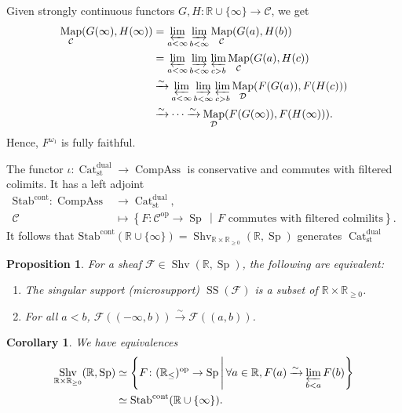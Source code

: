 \documentclass[draft]{amsart}
\newcommand{\RR}{\mathbb{R}}
\newcommand{\set}[2]{\left\{#1\,\middle|\,#2\right\}}
\newcommand{\cat}[1]{\mathcal{#1}}
\newcommand{\sheaf}[1]{\mathcal{#1}}
\newcommand{\op}{\mathrm{op}}
\newcommand{\isoto}{\mathbin{\xrightarrow{\sim}}}
\newcommand{\Stab}{\mathrm{Stab}}
\DeclareMathOperator{\SingularSupport}{SS}
\DeclareMathOperator{\Map}{Map}
\DeclareMathOperator{\Shv}{Shv}
\DeclareMathOperator{\Cat}{Cat}
\DeclareMathOperator{\CompAss}{CompAss}
\DeclareMathOperator{\Sp}{Sp}
\newtheorem{prop}[thm]{Proposition}
\newtheorem{cor}[thm]{Corollary}
\theoremstyle{definition}
\begin{document}
Given strongly continuous functors $G, H\colon \RR\cup \{\infty\} \to \cat C$, we get
\begin{align*}
\Map_{\cat C}(G(\infty), H(\infty)) &= \varprojlim\limits_{a<\infty} \varinjlim\limits_{b<\infty} \Map_{\cat C}(G(a), H(b)) \\
&= \varprojlim\limits_{a<\infty} \varinjlim\limits_{b<\infty} \varprojlim\limits_{c>b} \Map_{\cat C}(G(a), H(c)) \\
&\isoto \varprojlim\limits_{a<\infty} \varinjlim\limits_{b<\infty} \varprojlim\limits_{c>b} \Map_{\cat D}(F(G(a)), F(H(c))) \\
&\isoto \dotsb \isoto \Map_{\cat D}(F(G(\infty)), F(H(\infty))).
\end{align*}
Hence, $F^{\omega_1}$ is fully faithful.
\bigskip

The functor $\iota\colon \Cat^{\mathrm{dual}}_{\mathrm{st}} \to \CompAss$ is conservative and commutes with filtered colimits. It has a left adjoint 
\begin{align*}
\Stab^{\mathrm{cont}} \colon \CompAss &\to \Cat^{\mathrm{dual}}_{\mathrm{st}}, \\
\cat C &\mapsto \set{F\colon \cat C^\op\to \Sp}{\text{$F$ commutes with filtered colmilits}}.
\end{align*}
It follows that $\Stab^{\mathrm{cont}}(\RR\cup\{\infty\}) = \Shv_{\RR\times \RR_{\ge0}}(\RR, \Sp)$ generates $\Cat^{\mathrm{dual}}_{\mathrm{st}}$

\begin{prop}
For a sheaf $\sheaf F \in \Shv(\RR, \Sp)$, the following are equivalent:
\begin{enumerate}[(1)]
\item The singular support (microsupport) $\SingularSupport(\sheaf F)$ is a subset of $\RR\times \RR_{\ge0}$.
\item For all $a<b$, $\sheaf F((-\infty,b)) \isoto \sheaf F((a,b))$.
\end{enumerate}
\end{prop}

\begin{cor}
We have equivalences
\begin{align*}
\Shv_{\RR\times \RR_{\ge0}}(\RR, \Sp) &\simeq \set{F\colon (\RR_{\le})^\op \to \Sp}{\forall a\in \RR, F(a) \isoto \varprojlim\limits_{b<a} F(b)} \\
&\simeq \Stab^{\mathrm{cont}}(\RR\cup\{\infty\}).
\end{align*}
\end{cor}
\end{document}
